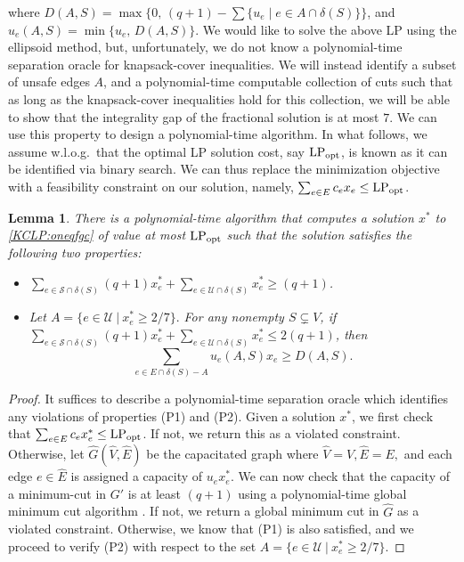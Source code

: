 \documentclass[11pt]{article}
\newtheorem{lemma}[theorem]{Lemma}
\newcommand\lpopt{\hbox{\text{LP}$_{\text{opt}}$}}
\newcommand{\safe}{\mathscr{S}}
\newcommand{\unsafe}{\mathscr{U}}
\newcommand\hG{\hat{G}}
\newcommand\hE{\hat{E}}
\newcommand\hV{\hat{V}}
\newcommand{\oneqfgcapx}{7}
\begin{document}
{where $D(A,S) = \max\{0,\, (q+1)-\sum\{ u_e \mid e\in{A}\cap\delta(S)\}\}$, and $u_e(A,S) = \min\{u_e,\, D(A,S)\}$.
We would like to solve the above LP using the ellipsoid method, but, unfortunately, we do not know a polynomial-time separation oracle for knapsack-cover inequalities. We will instead identify a subset of unsafe edges $A$, and a polynomial-time computable collection of cuts such that as long as the knapsack-cover inequalities hold for this collection, we will be able to show that the integrality gap of the fractional solution is at most $\oneqfgcapx$. We can use this property to design a polynomial-time algorithm. In what follows, we assume w.l.o.g.\ that the optimal LP solution cost, say $\lpopt$, is known as it can be identified via binary search. We can thus replace the minimization objective with a feasibility constraint on our solution, namely, $\sum_{e\in E}c_e x_e \leq \lpopt$.



\begin{lemma}\label{lem:polytimeKC-oneqfgc}
There is a polynomial-time algorithm that computes a solution $x^*$ to \eqref{KCLP:oneqfgc} of value at most $\lpopt$ such that the solution satisfies the following two properties:

\begin{itemize}
\item[(P1)]
$\sum_{e\in\safe\cap\delta(S)} (q+1) x^*_e + \sum_{e\in\unsafe\cap\delta(S)} x^*_e \geq (q+1)$.

\item[(P2)]
Let $A = \{ e \in  \unsafe~|~x^*_e \ge 2/7 \}.$
For any nonempty ${S}\subsetneq{V}$,
if $\sum_{e\in\safe\cap\delta(S)} (q+1) x^*_e +
\sum_{e\in\unsafe\cap\delta(S)} x^*_e \leq 2(q+1)$, then
$$\sum_{e\in E\cap\delta(S) - A} u_e(A,S) x_e \geq D(A,S).$$
\end{itemize}
\end{lemma}
\begin{proof}
It suffices to describe a polynomial-time separation oracle which identifies any violations of properties (P1) and (P2). Given a solution $x^*$, we first check that $\sum_{e \in E} c_e x_e^* \le \lpopt$. If not, we return this as a violated constraint. Otherwise, let $\hG(\hV,\hE)$ be the capacitated graph where $\hV=V,\hE=E,$ and each edge $e \in \hE$ is assigned a capacity of $u_ex_e^*$. We can now check that the capacity of a minimum-cut in $G'$ is at least $(q+1)$ using a polynomial-time global minimum cut algorithm \cite{Schrijver-book}.  If not, we return a global minimum cut in $\hG$ as a violated constraint. Otherwise, we know that (P1) is also satisfied, and we proceed to verify (P2) with respect to the set  $A = \{ e \in  \unsafe~|~x^*_e \ge 2/7 \}$. 



\end{proof}}
\end{document}

